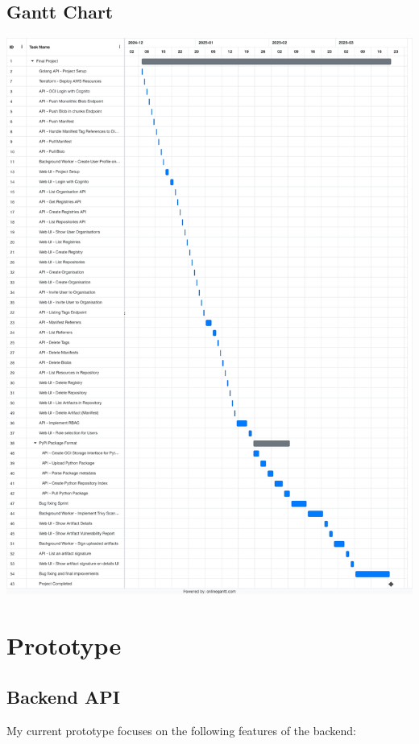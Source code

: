 \documentclass{article}
\begin{document}
  \subsection{Gantt Chart}
  \includegraphics[scale=0.27]{gantt.png}

  \section{Prototype}

  \subsection{Backend API}

  My current prototype focuses on the following features of the backend:
\end{document}
